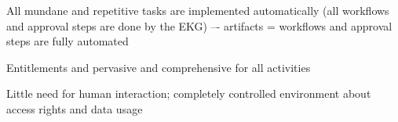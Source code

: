 \begin{members-only}
\begin{scoring}
\end{scoring}

\kgmmscoringlevelFive

\begin{scoring}

  \item All mundane and repetitive tasks are implemented automatically
        (all workflows and approval steps are done by the EKG) –- artifacts = workflows and
        approval steps are fully automated
  \item Entitlements and pervasive and comprehensive for all activities
  \item Little need for human interaction; completely controlled environment about access rights and data usage

\end{scoring}

\end{members-only}
